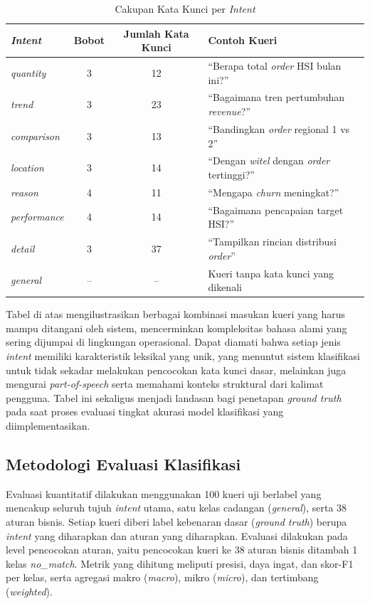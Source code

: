 \begin{table}[htbp]
\centering
\caption{Cakupan Kata Kunci per \textit{Intent}}
\label{tab:eval-intent-coverage}
\begin{tabular}{|p{3cm}|c|c|p{5cm}|}
\hline
\textbf{\textit{Intent}} & \textbf{Bobot} & \textbf{Jumlah Kata Kunci} & \textbf{Contoh Kueri} \\
\hline
\textit{quantity} & 3 & 12 & ``Berapa total \textit{order} HSI bulan ini?'' \\
\hline
\textit{trend} & 3 & 23 & ``Bagaimana tren pertumbuhan \textit{revenue}?'' \\
\hline
\textit{comparison} & 3 & 13 & ``Bandingkan \textit{order} regional 1 vs 2'' \\
\hline
\textit{location} & 3 & 14 & ``Dengan \textit{witel} dengan \textit{order} tertinggi?'' \\
\hline
\textit{reason} & 4 & 11 & ``Mengapa \textit{churn} meningkat?'' \\
\hline
\textit{performance} & 4 & 14 & ``Bagaimana pencapaian target HSI?'' \\
\hline
\textit{detail} & 3 & 37 & ``Tampilkan rincian distribusi \textit{order}'' \\
\hline
\textit{general} & -- & -- & Kueri tanpa kata kunci yang dikenali \\
\hline
\end{tabular}
\end{table}

Tabel di atas mengilustrasikan berbagai kombinasi masukan kueri yang harus mampu ditangani oleh sistem, mencerminkan kompleksitas bahasa alami yang sering dijumpai di lingkungan operasional. Dapat diamati bahwa setiap jenis \textit{intent} memiliki karakteristik leksikal yang unik, yang menuntut sistem klasifikasi untuk tidak sekadar melakukan pencocokan kata kunci dasar, melainkan juga mengurai \textit{part-of-speech} serta memahami konteks struktural dari kalimat pengguna. Tabel ini sekaligus menjadi landasan bagi penetapan \textit{ground truth} pada saat proses evaluasi tingkat akurasi model klasifikasi yang diimplementasikan.

\subsection{Metodologi Evaluasi Klasifikasi}

Evaluasi kuantitatif dilakukan menggunakan 100 kueri uji berlabel yang mencakup seluruh tujuh \textit{intent} utama, satu kelas cadangan (\textit{general}), serta 38 aturan bisnis. Setiap kueri diberi label kebenaran dasar (\textit{ground truth}) berupa \textit{intent} yang diharapkan dan aturan yang diharapkan. Evaluasi dilakukan pada level pencocokan aturan, yaitu pencocokan kueri ke 38 aturan bisnis ditambah 1 kelas \textit{no\_match}. Metrik yang dihitung meliputi presisi, daya ingat, dan skor-F1 per kelas, serta agregasi makro (\textit{macro}), mikro (\textit{micro}), dan tertimbang (\textit{weighted}).

